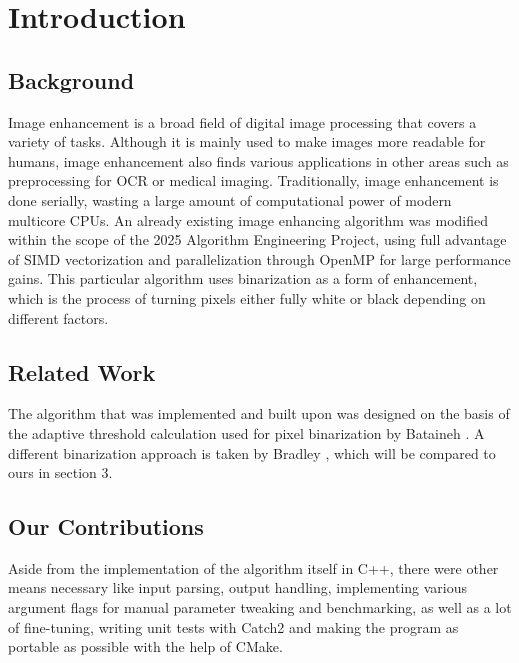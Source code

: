 \documentclass[sigconf]{acmart}
\begin{document}
\let\thefootnote\relax{}


\section{Introduction}

\sloppy
\subsection{Background}
Image enhancement is a broad field of digital image processing that covers a variety of tasks. Although it is mainly used to make images more readable for humans, image enhancement also finds various applications in other areas such as preprocessing for OCR or medical imaging. Traditionally, image enhancement is done serially, wasting a large amount of computational power of modern multicore CPUs. An already existing image enhancing algorithm was modified within the scope of the 2025 Algorithm Engineering Project, using full advantage of SIMD vectorization and parallelization through OpenMP for large performance gains. This particular algorithm uses binarization as a form of enhancement, which is the process of turning pixels either fully white or black depending on different factors.

\subsection{Related Work}
The algorithm that was implemented and built upon was designed on the basis of the adaptive threshold calculation used for pixel binarization by Bataineh \cite{Bataineh2011}. A different binarization approach is taken by Bradley \cite{Bradley2007}, which will be compared to ours in section 3.

\subsection{Our Contributions}
Aside from the implementation of the algorithm itself in C++, there were other means necessary like input parsing, output handling, implementing various argument flags for manual parameter tweaking and benchmarking, as well as a lot of fine-tuning, writing unit tests with Catch2 and making the program as portable as possible with the help of CMake.
\end{document}
